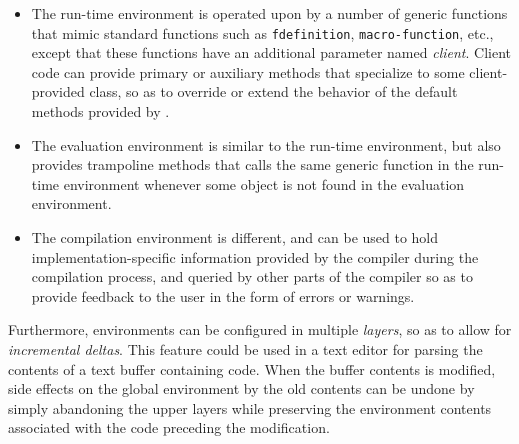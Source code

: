 \begin{itemize}
\item The run-time environment is operated upon by a number of generic
  functions that mimic standard \commonlisp{} functions such as
  \texttt{fdefinition}, \texttt{macro-function}, etc., except that
  these functions have an additional parameter named \emph{client}.
  Client code can provide primary or auxiliary methods that specialize
  to some client-provided class, so as to override or extend the
  behavior of the default methods provided by \clostrum{}.
\item The evaluation environment is similar to the run-time
  environment, but also provides trampoline methods that calls the
  same generic function in the run-time environment whenever some
  object is not found in the evaluation environment.
\item The compilation environment is different, and can be used to
  hold imple\-mentation-specific information provided by the compiler
  during the compilation process, and queried by other parts of the
  compiler so as to provide feedback to the user in the form of errors
  or warnings.
\end{itemize}

Furthermore, \clostrum{} environments can be configured in multiple
\emph{layers}, so as to allow for \emph{incremental deltas}.  This
feature could be used in a text editor for parsing the contents of a
text buffer containing \commonlisp{} code.  When the buffer contents
is modified, side effects on the global environment by the old
contents can be undone by simply abandoning the upper layers while
preserving the environment contents associated with the code preceding
the modification.

